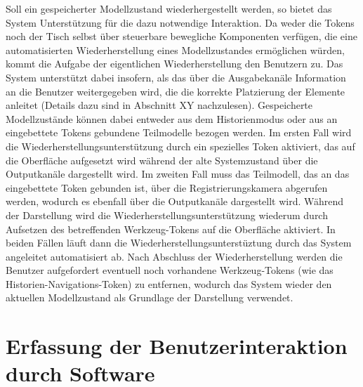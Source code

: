 Soll ein gespeicherter Modellzustand wiederhergestellt werden, so bietet das System Unterstützung für die dazu notwendige Interaktion. Da weder die Tokens noch der Tisch selbst über steuerbare bewegliche Komponenten verfügen, die eine automatisierten Wiederherstellung eines Modellzustandes ermöglichen würden, kommt die Aufgabe der eigentlichen Wiederherstellung den Benutzern zu. Das System unterstützt dabei insofern, als das über die Ausgabekanäle Information an die Benutzer weitergegeben wird, die die korrekte Platzierung der Elemente anleitet (Details dazu sind in Abschnitt XY nachzulesen). Gespeicherte Modellzustände können dabei entweder aus dem Historienmodus oder aus an eingebettete Tokens gebundene Teilmodelle bezogen werden. Im ersten Fall wird die Wiederherstellungsunterstützung durch ein spezielles Token aktiviert, das auf die Oberfläche aufgesetzt wird während der alte Systemzustand über die Outputkanäle dargestellt wird. Im zweiten Fall muss das Teilmodell, das an das eingebettete Token gebunden ist, über die Registrierungskamera abgerufen werden, wodurch es ebenfall über die Outputkanäle dargestellt wird. Während der Darstellung wird die Wiederherstellungsunterstützung wiederum durch Aufsetzen des betreffenden Werkzeug-Tokens auf die Oberfläche aktiviert. In beiden Fällen läuft dann die Wiederherstellungsunterstüztung durch das System angeleitet automatisiert ab. Nach Abschluss der Wiederherstellung werden die Benutzer aufgefordert eventuell noch vorhandene Werkzeug-Tokens (wie das Historien-Navigations-Token) zu entfernen, wodurch das System wieder den aktuellen Modellzustand als Grundlage der Darstellung verwendet.
 


\section{Erfassung der Benutzerinteraktion durch Software} %
\label{sec:erfassung_der_benutzerinteraktion_durch_softfware}


